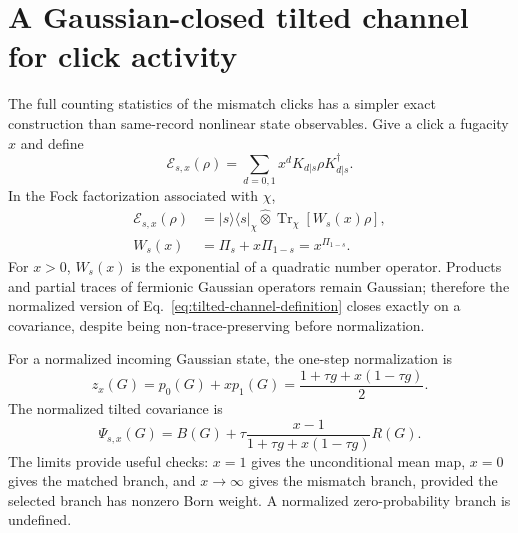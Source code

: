 \documentclass[
  aps,prx,twocolumn,superscriptaddress,longbibliography,
  nofootinbib,floatfix
]{revtex4-2}
\newcommand{\Tr}{\operatorname{Tr}}
\newcommand{\cE}{\mathcal{E}}
\newcommand{\proj}[1]{\lvert #1\rangle\!\langle #1\rvert}
\theoremstyle{plain}
\theoremstyle{definition}
\begin{document}
\section[Tilted channel for click activity]
{A Gaussian-closed tilted channel for click activity}
\label{sec:activity-tilt}

The full counting statistics of the mismatch clicks has a simpler exact
construction than same-record nonlinear state observables.  Give a click a
fugacity \(x\) and define
\begin{equation}
 \cE_{s,x}(\rho)
 =\sum_{d=0,1}x^dK_{d|s}\rho K_{d|s}^\dagger.
 \label{eq:tilted-channel-definition}
\end{equation}
In the Fock factorization associated with \(\chi\),
\begin{equation}
 \boxed{\begin{aligned}
 \cE_{s,x}(\rho)
 &=\proj{s}_\chi\widehat\otimes
 \Tr_\chi\!\left[W_s(x)\rho\right],\\
 W_s(x)&=\Pi_s+x\Pi_{1-s}=x^{\Pi_{1-s}}.
 \end{aligned}}
 \label{eq:tilted-block-identity}
\end{equation}
For \(x>0\), \(W_s(x)\) is the exponential of a quadratic number operator.
Products and partial traces of fermionic Gaussian operators remain Gaussian;
therefore the normalized version of Eq.~\eqref{eq:tilted-channel-definition}
closes exactly on a covariance, despite being non-trace-preserving before
normalization.

For a normalized incoming Gaussian state, the one-step normalization is
\begin{equation}
 z_x(G)=p_0(G)+xp_1(G)
 =\frac{1+\tau g+x(1-\tau g)}{2}.
 \label{eq:tilted-normalization}
\end{equation}
The normalized tilted covariance is
\begin{equation}
 \boxed{
 \Psi_{s,x}(G)
 =B(G)+\tau
 \frac{x-1}{1+\tau g+x(1-\tau g)}R(G).}
 \label{eq:tilted-covariance-map}
\end{equation}
The limits provide useful checks:
\(x=1\) gives the unconditional mean map, \(x=0\) gives the matched branch,
and \(x\to\infty\) gives the mismatch branch, provided the selected branch
has nonzero Born weight.  A normalized zero-probability branch is undefined.
\end{document}
